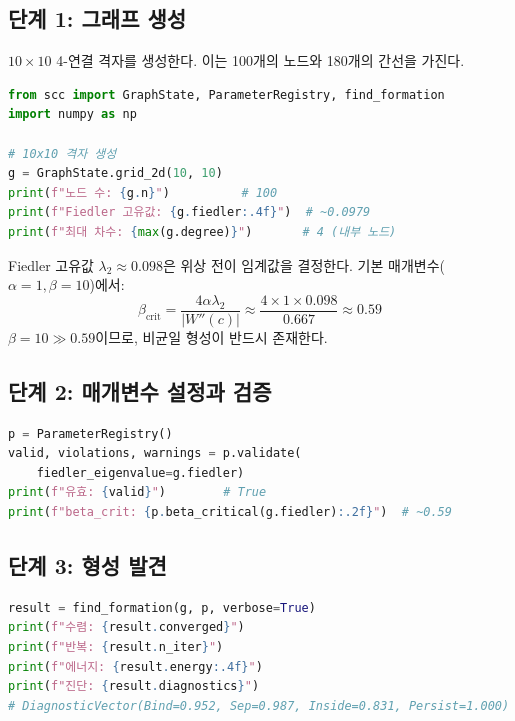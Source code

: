 \subsection{단계 1: 그래프 생성}

$10 \times 10$ 4-연결 격자를 생성한다. 이는 100개의 노드와 180개의 간선을 가진다.

\begin{lstlisting}[language=Python, caption={그래프 생성과 기본 속성 확인}]
from scc import GraphState, ParameterRegistry, find_formation
import numpy as np

# 10x10 격자 생성
g = GraphState.grid_2d(10, 10)
print(f"노드 수: {g.n}")          # 100
print(f"Fiedler 고유값: {g.fiedler:.4f}")  # ~0.0979
print(f"최대 차수: {max(g.degree)}")       # 4 (내부 노드)
\end{lstlisting}

Fiedler 고유값 $\lambda_2 \approx 0.098$은 위상 전이 임계값을 결정한다. 기본 매개변수($\alpha = 1, \beta = 10$)에서:
\begin{equation}
    \beta_{\mathrm{crit}} = \frac{4\alpha\lambda_2}{|W''(c)|} \approx \frac{4 \times 1 \times 0.098}{0.667} \approx 0.59
\end{equation}
$\beta = 10 \gg 0.59$이므로, 비균일 형성이 반드시 존재한다.

\subsection{단계 2: 매개변수 설정과 검증}

\begin{lstlisting}[language=Python, caption={매개변수 설정과 검증}]
p = ParameterRegistry()
valid, violations, warnings = p.validate(
    fiedler_eigenvalue=g.fiedler)
print(f"유효: {valid}")        # True
print(f"beta_crit: {p.beta_critical(g.fiedler):.2f}")  # ~0.59
\end{lstlisting}

\subsection{단계 3: 형성 발견}

\begin{lstlisting}[language=Python, caption={형성 발견과 결과 해석}]
result = find_formation(g, p, verbose=True)
print(f"수렴: {result.converged}")
print(f"반복: {result.n_iter}")
print(f"에너지: {result.energy:.4f}")
print(f"진단: {result.diagnostics}")
# DiagnosticVector(Bind=0.952, Sep=0.987, Inside=0.831, Persist=1.000)
\end{lstlisting}


